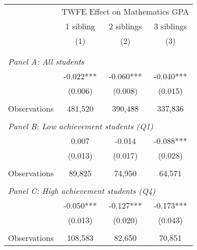 \makeatletter
{}
{
\makeatother
\begin{tabular}{lccc}
\toprule
\cmidrule(lr){2-4}
& \multicolumn{3}{c}{TWFE Effect on Mathematics GPA} \\
\cmidrule(lr){2-4}
& 1 sibling & 2 siblings & 3 siblings  \\
\cmidrule(lr){2-2} \cmidrule(lr){3-3} \cmidrule(lr){4-4}
& (1) & (2) & (3)\\
\bottomrule
&  &  &  \\
&  &  &   \\
\multicolumn{4}{l}{\textit{Panel A: All students}} \\
\hspace{3mm}        &      -0.022***&      -0.060***&      -0.040***\\
                    &     (0.006)   &     (0.008)   &     (0.015)   \\
                    &               &               &               \\
\hspace{3mm}Observations&     481,520   &     390,488   &     337,836   \\
 
&  &  &   \\
\multicolumn{4}{l}{\textit{Panel B: Low achievement students (Q1)}} \\
\hspace{3mm}        &       0.007   &      -0.014   &      -0.088***\\
                    &     (0.013)   &     (0.017)   &     (0.028)   \\
                    &               &               &               \\
\hspace{3mm}Observations&      89,825   &      74,950   &      64,571   \\
 
&  &  &   \\
\multicolumn{4}{l}{\textit{Panel C: High achievement students (Q4)}} \\
\hspace{3mm}        &      -0.050***&      -0.127***&      -0.173***\\
                    &     (0.013)   &     (0.020)   &     (0.043)   \\
                    &               &               &               \\
\hspace{3mm}Observations&     108,583   &      82,650   &      70,851   \\
 

\end{tabular}}
